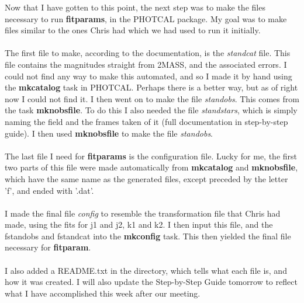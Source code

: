 \documentclass[a4paper]{article}
\begin{document}
Now that I have gotten to this point, the next step was to make the files necessary to run \textbf{fitparams}, in the PHOTCAL package.  My goal was to make files similar to the ones Chris had which we had used to run it initially.  \\ \\
The first file to make, according to the documentation, is the \textit{standcat} file.  This file contains the magnitudes straight from 2MASS, and the associated errors.  I could not find any way to make this automated, and so I made it by hand using the \textbf{mkcatalog} task in PHOTCAL.  Perhaps there is a better way, but as of right now I could not find it.  I then went on to make the file \textit{standobs}.  This comes from the task \textbf{mknobsfile}.  To do this I also needed the file \textit{standstars}, which is simply naming the field and the frames taken of it (full documentation in step-by-step guide).  I then used \textbf{mknobsfile} to make the file \textit{standobs}.  \\ \\
The last file I need for \textbf{fitparams} is the configuration file.  Lucky for me, the first two parts of this file were made automatically from \textbf{mkcatalog} and \textbf{mknobsfile}, which have the same name as the generated files, except preceded by the letter 'f', and ended with '.dat'. \\ \\
I made the final file \textit{config} to resemble the transformation file that Chris had made, using the fits for j1 and j2, k1 and k2.  I then input this file, and the fstandobs and fstandcat into the \textbf{mkconfig} task.  This then yielded the final file necessary for \textbf{fitparam}.  \\ \\
I also added a README.txt in the directory, which tells what each file is, and how it was created.  I will also update the Step-by-Step Guide tomorrow to reflect what I have accomplished this week after our meeting.  
\end{document}
